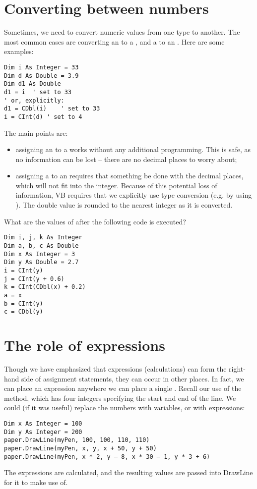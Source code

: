 	\section{Converting between numbers}
		Sometimes, we need to convert numeric values from one type to another. The most common cases are converting an  to a , and a  to an . Here are some examples:
		\begin{lstlisting}
Dim i As Integer = 33
Dim d As Double = 3.9
Dim d1 As Double
d1 = i	' set to 33
' or, explicitly:
d1 = CDbl(i)	' set to 33
i = CInt(d)	' set to 4
		\end{lstlisting}
		The main points are:
		\begin{itemize}
			\item assigning an  to a  works without any additional programming. This is safe, as no information can be lost – there are no decimal places to worry about;
			\item assigning a  to an  requires that something be done with the decimal places, which will not fit into the integer. Because of this potential loss of information, VB requires that we explicitly use type conversion (e.g. by using ). The double value is rounded to the nearest integer as it is converted.
		\end{itemize}

		\begin{stqb}
			\begin{STQ}
			\item	What are the values of  after the following code is executed?
					\begin{lstlisting}
Dim i, j, k As Integer
Dim a, b, c As Double
Dim x As Integer = 3
Dim y As Double = 2.7
i = CInt(y)
j = CInt(y + 0.6)
k = CInt(CDbl(x) + 0.2)
a = x
b = CInt(y)
c = CDbl(y)
					\end{lstlisting}
			\end{STQ}
		\end{stqb}

	\section{The role of expressions}
		Though we have emphasized that expressions (calculations) can form the right-hand side of assignment statements, they can occur in other places. In fact, we can place an  expression anywhere we can place a single . Recall our use of the  method, which has four integers specifying the start and end of the line. We could (if it was useful) replace the numbers with variables, or with expressions:
		\begin{lstlisting}
Dim x As Integer = 100
Dim y As Integer = 200
paper.DrawLine(myPen, 100, 100, 110, 110)
paper.DrawLine(myPen, x, y, x + 50, y + 50)
paper.DrawLine(myPen, x * 2, y – 8, x * 30 – 1, y * 3 + 6)
		\end{lstlisting}
		The expressions are calculated, and the resulting values are passed into DrawLine for it to make use of.
		

